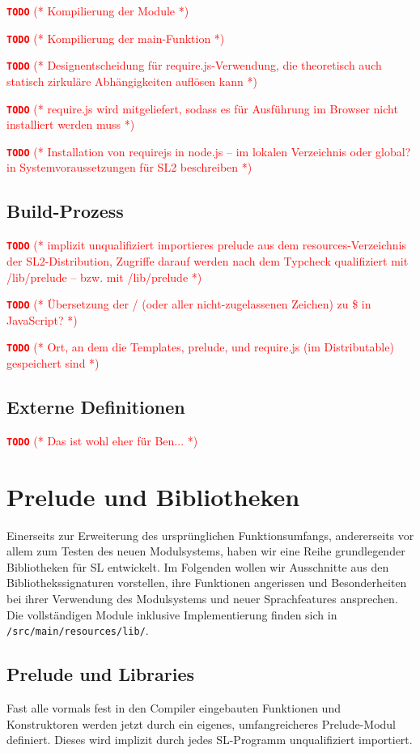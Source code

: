 \documentclass{llncs}
\newcommand{\TODO}[1]{ \textcolor{red}{\textbf{\texttt{\large{TODO}}} (* #1 *)}\par}
\begin{document}
\TODO{Kompilierung der Module}

\TODO{Kompilierung der main-Funktion}

\TODO{Designentscheidung für require.js-Verwendung, die theoretisch
auch statisch zirkuläre Abhängigkeiten auflösen kann}
\TODO{require.js wird mitgeliefert, sodass es für Ausführung im
Browser nicht installiert werden muss}
\TODO{Installation von requirejs in node.js -- im lokalen Verzeichnis
oder global? in Systemvoraussetzungen für SL2 beschreiben}

\subsection{Build-Prozess}
\label{sec:compBuild}

\TODO{implizit unqualifiziert importieres prelude aus dem
resources-Verzeichnis der SL2-Distribution, Zugriffe darauf werden
nach dem Typcheck qualifiziert mit /lib/prelude -- bzw. mit /lib/prelude}

\TODO{Übersetzung der / (oder aller nicht-zugelassenen Zeichen) zu \$
in JavaScript?}

\TODO{Ort, an dem die Templates, prelude, und require.js (im Distributable)
gespeichert sind}

\subsection{Externe Definitionen}
\TODO{Das ist wohl eher für Ben...}

\section{Prelude und Bibliotheken}

Einerseits zur Erweiterung des ursprünglichen Funktionsumfangs, andererseits
vor allem zum Testen des neuen Modulsystems, haben wir eine Reihe grundlegender
Bibliotheken für SL entwickelt. Im Folgenden wollen wir Ausschnitte aus den
Bibliothekssignaturen vorstellen, ihre Funktionen angerissen und
Besonderheiten bei ihrer Verwendung des Modulsystems und neuer Sprachfeatures
ansprechen. Die vollständigen Module inklusive Implementierung finden sich
in \verb|/src/main/resources/lib/|.

\subsection{Prelude und Libraries}

Fast alle vormals fest in den Compiler eingebauten Funktionen und Konstruktoren
werden jetzt durch ein eigenes, umfangreicheres Prelude-Modul definiert.
Dieses wird implizit durch jedes SL-Programm unqualifiziert importiert.
\end{document}
